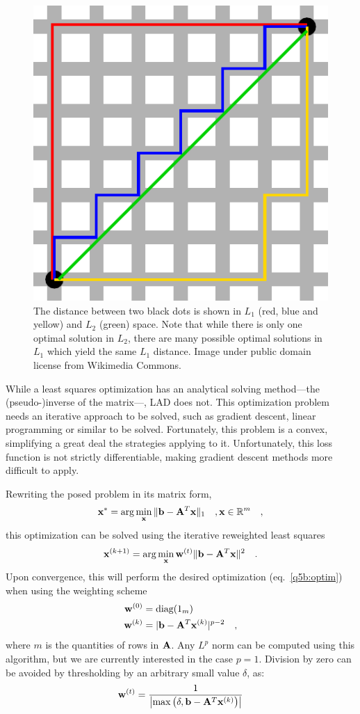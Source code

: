 \documentclass{report}
\begin{document}
\begin{figure}
  \centering
  \includegraphics[width=0.45\linewidth]{q5b_manhattan_distance.pdf}
  \caption[ Examples of $L_1$ and $L_2$ distances ]
   {The distance between two black dots is shown in $L_1$ (red, blue and yellow) and $L_2$ (green) space. Note that while there is only one optimal solution in $L_2$, there are many possible optimal solutions in $L_1$ which yield the same $L_1$ distance. Image under public domain license from Wikimedia Commons.}
   \label{q5b:paths}
\end{figure}

While a least squares optimization has an analytical solving method---the (pseudo-)inverse of the matrix---, LAD does not. This optimization problem needs an iterative approach to be solved, such as gradient descent, linear programming or similar to be solved. Fortunately, this problem is a convex, simplifying a great deal the strategies applying to it. Unfortunately, this loss function is not strictly differentiable, making gradient descent methods more difficult to apply.

Rewriting the posed problem in its matrix form,
\begin{equation}
\mathbf{x}^* = \arg \min_{\mathbf{x}} \| \mathbf{b} - \mathbf{A}^T\mathbf{x} \|_1 \quad, \mathbf{x} \in \mathbb{R}^m
\quad,
\label{q5b:optim}
\end{equation}
this optimization can be solved using the iterative reweighted least squares
\begin{equation}
\mathbf{x}^{(k+1)} = \arg \min_{\mathbf{x}} \mathbf{w}^{(t)} \| \mathbf{b} - \mathbf{A}^T\mathbf{x} \|^2
\quad.
\end{equation}
Upon convergence, this will perform the desired optimization (eq.~\eqref{q5b:optim}) when using the weighting scheme
\begin{align}
\mathbf{w}^{(0)} &= \text{diag}(1_m) \\
\mathbf{w}^{(k)} &= \lvert \mathbf{b} - \mathbf{A}^T\mathbf{x}^{(k)} \rvert^{p-2}
\quad,
\end{align}
where $m$ is the quantities of rows in $\mathbf{A}$. Any $L^p$ norm can be computed using this algorithm, but we are currently interested in the case $p = 1$. Division by zero can be avoided by thresholding by an arbitrary small value $\delta$, as:
\begin{equation}
\mathbf{w}^{(t)} = \frac{1}{ \left\lvert \max\left(\delta, \mathbf{b} - \mathbf{A}^T\mathbf{x}^{(k)}\right) \right\rvert}
\end{equation}
\end{document}
